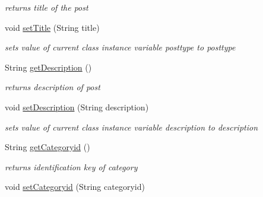 \begin{DoxyCompactItemize}
\begin{DoxyCompactList}\small\item\em returns title of the post \end{DoxyCompactList}\item 
\hypertarget{classcom_1_1example_1_1sel_1_1lostfound_1_1UserPost_ae6a0063912a761049b6fd38656600c84}{void \hyperlink{classcom_1_1example_1_1sel_1_1lostfound_1_1UserPost_ae6a0063912a761049b6fd38656600c84}{set\-Title} (\-String title)}\label{classcom_1_1example_1_1sel_1_1lostfound_1_1UserPost_ae6a0063912a761049b6fd38656600c84}

\begin{DoxyCompactList}\small\item\em sets value of current class instance variable posttype to posttype \end{DoxyCompactList}\item 
\hypertarget{classcom_1_1example_1_1sel_1_1lostfound_1_1UserPost_ac335baf708ee63a07daeabb30804c4bb}{\-String \hyperlink{classcom_1_1example_1_1sel_1_1lostfound_1_1UserPost_ac335baf708ee63a07daeabb30804c4bb}{get\-Description} ()}\label{classcom_1_1example_1_1sel_1_1lostfound_1_1UserPost_ac335baf708ee63a07daeabb30804c4bb}

\begin{DoxyCompactList}\small\item\em returns description of post \end{DoxyCompactList}\item 
\hypertarget{classcom_1_1example_1_1sel_1_1lostfound_1_1UserPost_a4901987ba0f3cb6d4c84d542c8cbc282}{void \hyperlink{classcom_1_1example_1_1sel_1_1lostfound_1_1UserPost_a4901987ba0f3cb6d4c84d542c8cbc282}{set\-Description} (\-String description)}\label{classcom_1_1example_1_1sel_1_1lostfound_1_1UserPost_a4901987ba0f3cb6d4c84d542c8cbc282}

\begin{DoxyCompactList}\small\item\em sets value of current class instance variable description to description \end{DoxyCompactList}\item 
\hypertarget{classcom_1_1example_1_1sel_1_1lostfound_1_1UserPost_a635cbd223deabe14c6344476b9c0344c}{\-String \hyperlink{classcom_1_1example_1_1sel_1_1lostfound_1_1UserPost_a635cbd223deabe14c6344476b9c0344c}{get\-Categoryid} ()}\label{classcom_1_1example_1_1sel_1_1lostfound_1_1UserPost_a635cbd223deabe14c6344476b9c0344c}

\begin{DoxyCompactList}\small\item\em returns identification key of category \end{DoxyCompactList}\item 
\hypertarget{classcom_1_1example_1_1sel_1_1lostfound_1_1UserPost_a49a8d15ea95d8b9c9aa837c0bf8952c6}{void \hyperlink{classcom_1_1example_1_1sel_1_1lostfound_1_1UserPost_a49a8d15ea95d8b9c9aa837c0bf8952c6}{set\-Categoryid} (\-String categoryid)}\label{classcom_1_1example_1_1sel_1_1lostfound_1_1UserPost_a49a8d15ea95d8b9c9aa837c0bf8952c6}


\end{DoxyCompactItemize}
